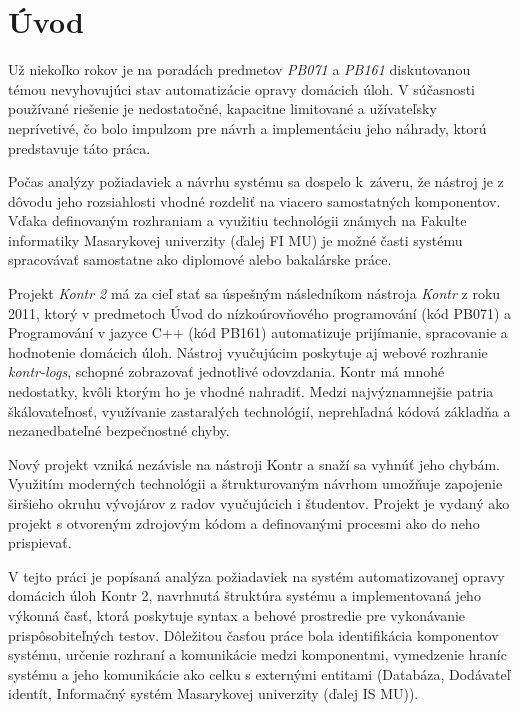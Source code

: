 \documentclass[
  digital, %
  twoside, %
  table,   %
  lof,     %
  lot,     %
]{fithesis3}
\begin{document}
\chapter*{Úvod}


Už niekoľko rokov je na poradách predmetov \textit{PB071} a \textit{PB161} diskutovanou témou nevyhovujúci stav automatizácie opravy domácich úloh. V súčasnosti používané riešenie je nedostatočné, kapacitne limitované a užívateľsky neprívetivé, čo bolo impulzom pre návrh a implementáciu jeho náhrady, ktorú predstavuje táto práca. %

Počas analýzy požiadaviek a návrhu systému sa dospelo k~záveru, že nástroj je z dôvodu jeho rozsiahlosti vhodné rozdeliť na viacero samostatných komponentov. Vďaka definovaným rozhraniam a využitiu technológii známych na Fakulte informatiky Masarykovej univerzity (ďalej FI MU) je možné časti systému spracovávať samostatne ako diplomové alebo bakalárske práce.

Projekt \textit{Kontr 2} má za cieľ stať sa úspešným následníkom nástroja \textit{Kontr} z roku 2011, ktorý v predmetoch Úvod do nízkoúrovňového programování (kód PB071) a Programování v jazyce C++ (kód PB161) automatizuje prijímanie, spracovanie a hodnotenie domácich úloh. Nástroj vyučujúcim poskytuje aj webové rozhranie \textit{kontr-logs}, schopné zobrazovať jednotlivé odovzdania. Kontr má mnohé nedostatky, kvôli ktorým ho je vhodné nahradiť. Medzi najvýznamnejšie patria škálovateľnosť, využívanie zastaralých technológií, neprehľadná kódová základňa a nezanedbateľné bezpečnostné chyby.

Nový projekt vzniká nezávisle na nástroji Kontr a snaží sa vyhnúť jeho chybám. Využitím moderných technológii a štrukturovaným návrhom umožňuje zapojenie širšieho okruhu vývojárov z radov vyučujúcich i študentov. Projekt je vydaný ako projekt s otvoreným zdrojovým kódom a definovanými procesmi ako do neho prispievať.

V tejto práci je popísaná analýza požiadaviek na systém automatizovanej opravy domácich úloh Kontr 2, navrhnutá štruktúra systému a implementovaná jeho výkonná časť, ktorá poskytuje syntax a behové prostredie pre vykonávanie prispôsobiteľných testov. Dôležitou časťou práce bola identifikácia komponentov systému, určenie rozhraní a komunikácie medzi komponentmi, vymedzenie hraníc systému a jeho komunikácie ako celku s externými entitami (Databáza, Dodávateľ identít, Informačný systém Masarykovej univerzity (ďalej IS MU)).
\end{document}
